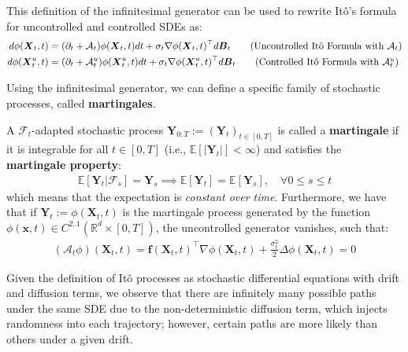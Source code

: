 \documentclass{article}
\newcommand{\boldtext}[1]{\textbf{\textcolor{MyGreen}{#1}}}
\begin{document}
This definition of the infinitesimal generator can be used to rewrite Itô's formula for uncontrolled and controlled SDEs as:
\begin{align}
    d\phi(\boldsymbol{X}_t,t)&=(\partial_t+\mathcal{A}_t)\phi(\boldsymbol{X}_t,t)dt+\sigma_t\nabla \phi(\boldsymbol{X}_t,t)^\top d\boldsymbol{B}_t\tag{Uncontrolled Itô Formula with $\mathcal{A}_t$}\label{eq:uncontrolled-ito-formula-generator}\nonumber\\
    d\phi(\boldsymbol{X}^u_t,t)&=(\partial_t+\mathcal{A}^u_t)\phi(\boldsymbol{X}^u_t,t)dt+\sigma_t\nabla \phi(\boldsymbol{X}^u_t,t)^\top d\boldsymbol{B}_t\tag{Controlled Itô Formula with $\mathcal{A}^u_t$}\label{eq:controlled-ito-formula-generator}
\end{align}

Using the infinitesimal generator, we can define a specific family of stochastic processes, called \boldtext{martingales}.

\begin{definition}[Martingales]\label{def:martingale}
    A $\mathcal{F}_t$-adapted stochastic process $\boldsymbol{Y}_{0:T}:=(\boldsymbol{Y}_t)_{t\in [0,T]}$ is called a \textbf{martingale} if it is integrable for all $t\in [0,T]$ (i.e., $\mathbb{E}[|\boldsymbol{Y}_t|]< \infty$) and satisfies the \textbf{martingale property}:
    \begin{align}
        \mathbb{E}[\boldsymbol{Y}_t|\mathcal{F}_s]=\boldsymbol{Y}_s\implies \mathbb{E}[\boldsymbol{Y}_t]=\mathbb{E}[\boldsymbol{Y}_s], \quad \forall 0\leq s\leq t\tag{Martingale Property}\label{eq:martingale-property}
    \end{align}
    which means that the expectation is \textit{constant over time}. Furthermore, we have that if $\boldsymbol{Y}_t:= \phi(\boldsymbol{X}_t,t)$ is the martingale process generated by the function $\phi(\boldsymbol{x},t)\in C^{2,1}(\mathbb{R}^d\times[0,T])$, the uncontrolled generator vanishes, such that:
    \begin{align}
        (\mathcal{A}_t\phi)(\boldsymbol{X}_t,t)=\boldsymbol{f}(\boldsymbol{X}_t,t)^\top \nabla \phi(\boldsymbol{X}_t,t)+\frac{\sigma^2_t}{2}\Delta \phi(\boldsymbol{X}_t,t)=0
    \end{align}
\end{definition}

Given the definition of Itô processes as stochastic differential equations with drift and diffusion terms, we observe that there are infinitely many possible paths under the same SDE due to the non-deterministic diffusion term, which injects randomness into each trajectory; however, certain paths are more likely than others under a given drift. 
\end{document}
